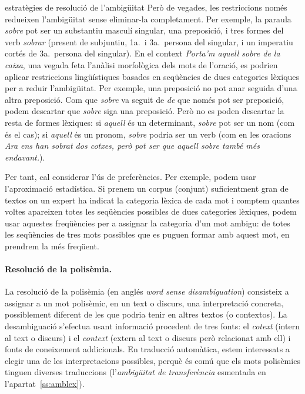 \begin{persabermes}{estratègies de resolució de l'ambigüitat}
  Però de vegades, les restriccions només redueixen l'ambigüitat sense
  eliminar-la completament.  Per exemple, la paraula \emph{sobre} pot
  ser un substantiu masculí singular, una preposició, i tres formes
  del verb \emph{sobrar} (present de subjuntiu, 1a.\ i 3a.\ persona
  del singular, i un imperatiu cortés de 3a.\ persona del
  singular). En el context \emph{Porta'm aquell sobre de la caixa},
  una vegada feta l'anàlisi morfològica dels mots de l'oració, es
  podrien aplicar restriccions lingüístiques basades en seqüències de
  dues categories lèxiques per a reduir l'ambigüitat. Per exemple, una
  preposició no pot anar seguida d'una altra preposició. Com que
  \emph{sobre} va seguit de \emph{de} que només pot ser preposició,
  podem descartar que \emph{sobre} siga una preposició. Però no es
  poden descartar la resta de formes lèxiques: si \emph{aquell} és un
  determinant, \emph{sobre} pot ser un nom (com és el cas); si
  \emph{aquell} és un pronom, \emph{sobre} podria ser un verb (com en
  les oracions \emph{Ara ens han sobrat dos cotxes, però pot ser que
    aquell sobre també més endavant.}).

  Per tant, cal considerar l'ús de preferències. Per exemple, podem
  usar l'aproximació estadística.  Si prenem un corpus (conjunt)
  suficientment gran de textos on un expert ha indicat la categoria
  lèxica de cada mot i comptem quantes voltes apareixen totes les
  seqüències possibles de dues categories lèxiques, podem usar
  aquestes freqüències per a assignar la categoria d'un mot ambigu: de
  totes les seqüències de tres mots possibles que es puguen formar amb
  aquest mot, en prendrem la més freqüent.

  \paragraph{Resolució de la polisèmia.}
  La resolució de la polisèmia (en anglés \emph{word sense
    disambiguation}) consisteix a assignar a un mot polisèmic, en un
  text o discurs, una interpretació concreta, possiblement diferent de
  les que podria tenir en altres textos (o contextos). La
  desambiguació s'efectua usant informació procedent de tres fonts: el
  \emph{cotext} (intern al text o discurs) i el \emph{context} (extern
  al text o discurs però relacionat amb ell) i fonts de coneixement
  addicionals.  En traducció automàtica, estem interessats a elegir
  una de les interpretacions possibles, perquè és comú que els mots
  polisèmics tinguen diverses traduccions (l'\emph{ambigüitat de
    transferència} esmentada en l'apartat~\ref{ss:amblex}).


\end{persabermes}
